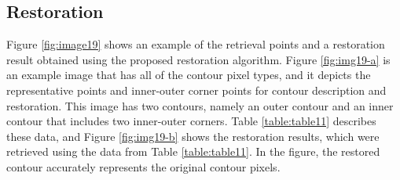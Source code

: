 \documentclass[sensors,article,accept,moreauthors,pdftex,10pt,a4paper]{mdpi}
\begin{document}
\subsection{Restoration}


Figure \ref{fig:image19} shows an example of the retrieval points and a restoration result obtained using the proposed restoration algorithm. Figure \ref{fig:img19-a} is an example image that has all of the contour pixel types, and it depicts the representative points and inner-outer corner points for contour description and restoration. This image has two contours, namely an outer contour and an inner contour that includes two inner-outer corners. Table \ref{table:table11} describes these data, and Figure \ref{fig:img19-b} shows the restoration results, which were retrieved using the data from Table \ref{table:table11}. In the figure, the restored contour accurately represents the original contour pixels.
\end{document}

